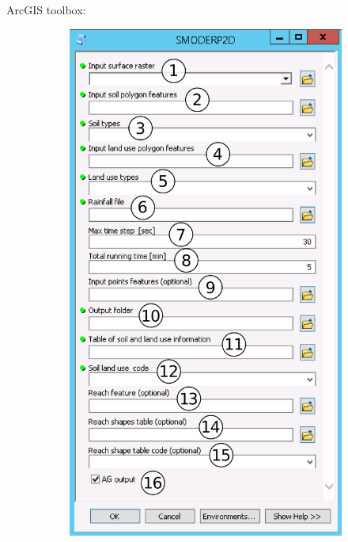         \begin{frame}
            ArcGIS toolbox:\vspace{-1em}
            \begin{figure}[t!]
            \centering
            \begin{minipage}[t]{.4\textwidth}
              \centering
              \vspace{0pt}
                \begin{figure}
                    \includegraphics[width=\textwidth]{obr/toolboxpopis4.png}

\end{figure}
\end{minipage}
\end{figure}
\end{frame}
